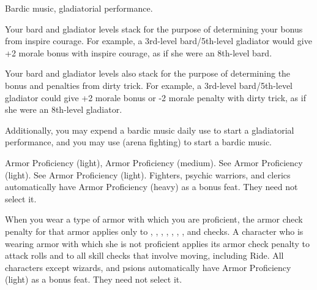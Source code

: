 {Bardic music, gladiatorial performance.}
{
Your bard and gladiator levels stack for the purpose of determining your bonus from inspire courage. For example, a 3rd-level bard/5th-level gladiator would give +2 morale bonus with inspire courage, as if she were an 8th-level bard.

Your bard and gladiator levels also stack for the purpose of determining the bonus and penalties from dirty trick. For example, a 3rd-level bard/5th-level gladiator could give +2 morale bonus or -2 morale penalty with dirty trick, as if she were an 8th-level gladiator.

Additionally, you may expend a bardic music daily use to start a gladiatorial performance, and you may use  (arena fighting) to start a bardic music.
}



{}
{Armor Proficiency (light), Armor Proficiency (medium).}
{See Armor Proficiency (light).}
{See Armor Proficiency (light).}
{Fighters, psychic warriors, and clerics automatically have Armor Proficiency (heavy) as a bonus feat. They need not select it.}

{}{}
{When you wear a type of armor with which you are proficient, the armor check penalty for that armor applies only to , , , , , , , and  checks.}
{A character who is wearing armor with which she is not proficient applies its armor check penalty to attack rolls and to all skill checks that involve moving, including Ride.}
{All characters except wizards, and psions automatically have Armor Proficiency (light) as a bonus feat. They need not select it.}


